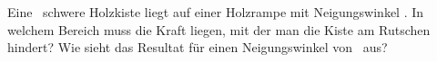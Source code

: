 Eine \mKiO\ schwere Holzkiste liegt auf einer Holzrampe mit Neigungswinkel \wiAO. In welchem Bereich muss die Kraft liegen, mit der man die Kiste am Rutschen hindert? Wie sieht das Resultat für einen Neigungswinkel von \wiBO\ aus?
